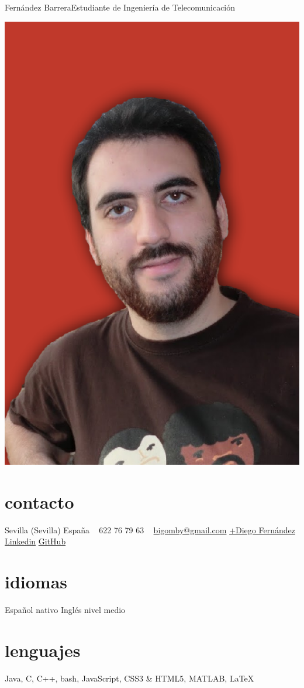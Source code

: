 \documentclass[hidelinks]{friggeri-cv} %
\begin{document}
 {Fernández Barrera}{Estudiante de Ingeniería de Telecomunicación} %


\begin{aside} %
\includegraphics[width=\textwidth]{images/photo.png}
\section{contacto}
Sevilla (Sevilla)
España
~
622 76 79 63
~
\href{mailto:bigomby@gmail.com}{bigomby@gmail.com}
\href{http://google.com/+DiegoFernandezBarrera}{+Diego Fernández}
\href{es.linkedin.com/in/dieferbar}{Linkedin}
\href{https://github.com/Bigomby}{GitHub}
\section{idiomas}
Español nativo
Inglés nivel medio
\section{lenguajes}
{Java, C, C++, bash, JavaScript, CSS3 \& HTML5, MATLAB, \LaTeX}
\end{aside}
\end{document}
